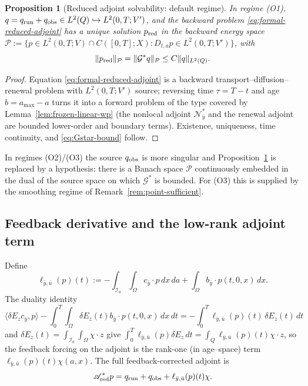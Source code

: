\documentclass[pdflatex,sn-mathphys-num]{sn-jnl}
\theoremstyle{plain}
\newtheorem{proposition}[theorem]{Proposition}
\theoremstyle{definition}
\theoremstyle{remark}
\begin{document}
\begin{proposition}[Reduced adjoint solvability: default regime]
\label{prop:reduced-adjoint-solvability}
In regime (O1), $q=q_{\rm run}+q_{\rm obs}\in L^2(Q)\hookrightarrow
L^2(0,T;V')$, and the backward problem \eqref{eq:formal-reduced-adjoint} has a
unique solution $p_{\rm red}$ in the backward energy space
$\mathcal P:=\{p\in L^2(0,T;V)\cap  C([0,T];X):
D_{t,a}p\in L^2(0,T;V')\}$, with
\begin{equation}
\label{eq:Gstar-bound}
\|p_{\rm red}\|_{\mathcal P}=\|\mathcal G^* q\|_{\mathcal P}
\le
C\|q\|_{L^2(Q)} .
\end{equation}
\end{proposition}

\begin{proof}
Equation \eqref{eq:formal-reduced-adjoint} is a backward
transport--diffusion--renewal problem with $L^2(0,T;V')$ source; reversing time
$\tau=T-t$ and age $b=a_{\max}-a$ turns it into a forward problem of the type
covered by Lemma~\ref{lem:frozen-linear-wp} (the nonlocal adjoint
$\mathcal N_{\bar y}^*$ and the renewal adjoint are bounded lower-order and
boundary terms). Existence, uniqueness, time continuity, and
\eqref{eq:Gstar-bound} follow.
\end{proof}

In regimes (O2)/(O3) the source $q_{\rm obs}$ is more singular and
Proposition~\ref{prop:reduced-adjoint-solvability} is replaced by a hypothesis:
there is a Banach space $\mathcal P$ continuously embedded in the dual of the
source space on which $\mathcal G^*$ is bounded. For (O3) this is supplied by
the smoothing regime of Remark~\ref{rem:point-sufficient}.

\subsection{Feedback derivative and the low-rank adjoint term}
\label{subsec:feedback-adjoint-term}
Define
\begin{equation}
\label{eq:ell-definition}
\ell_{\bar y,\bar u}(p)(t)
:=
-
\int_{\mathcal I_a}\int_\Omega
c_{\bar y}\cdot p\,dx\,da
+
\int_\Omega
b_{\bar y}\cdot p(t,0,x)\,dx .
\end{equation}
The duality identity
\[
\langle\delta E_z c_{\bar y},p\rangle
-
\int_0^T\!\!\int_\Omega\delta E_z(t)b_{\bar y}\cdot p(t,0,x)\,dx\,dt
=
-\int_0^T\ell_{\bar y,\bar u}(p)(t)\,\delta E_z(t)\,dt
\]
and $\delta E_z(t)=\int_{\mathcal I_a}\int_\Omega\chi\cdot z$ give
$\int_0^T\ell_{\bar y,\bar u}(p)\delta E_z\,dt=\int_Q\ell_{\bar y,\bar u}(p)(t)
\chi\cdot z$, so the feedback forcing on the adjoint is the rank-one (in
age--space) term $\ell_{\bar y,\bar u}(p)(t)\chi(a,x)$. The full
feedback-corrected adjoint is
\begin{equation}
\label{eq:feedback-corrected-adjoint-abstract}
\mathscr A_{\rm red}^*p
=
q_{\rm run}+q_{\rm obs}
+
\ell_{\bar y,\bar u}(p)(t)\chi .
\end{equation}
\end{document}
